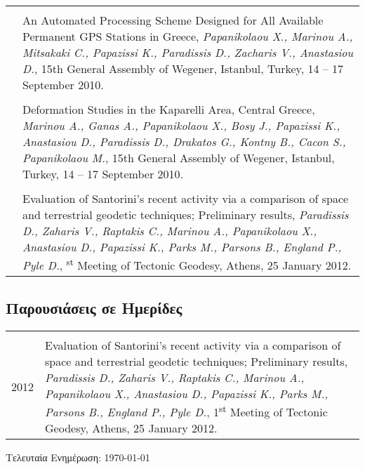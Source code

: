\documentclass[a4paper,10pt]{article} %
\begin{document}
\begin{longtable}{r|p{14cm}}
  &\\

  & An Automated Processing Scheme Designed for All Available Permanent GPS Stations in Greece,
  \emph{Papanikolaou X., Marinou A., Mitsakaki C., Papazissi K., Paradissis D., Zacharis V., Anastasiou D.},
  15th General Assembly of Wegener, Istanbul, Turkey, 14 – 17 September 2010.\\

  &\\

  & Deformation Studies in the Kaparelli Area, Central Greece,
  \emph{Marinou A., Ganas A., Papanikolaou X., Bosy J., Papazissi K., Anastasiou D., Paradissis D., Drakatos G., Kontny B., Cacon S., Papanikolaou M.},
  15th General Assembly of Wegener, Istanbul, Turkey, 14 – 17 September 2010.\\

  &\\

  & Evaluation of Santorini's recent activity via a comparison of space and terrestrial geodetic techniques; Preliminary results,
  \emph{Paradissis D., Zaharis V., Raptakis C., Marinou A., Papanikolaou X., Anastasiou D., Papazissi K., Parks M., Parsons B., England P., Pyle D.},
  \textsuperscript{st} Meeting of Tectonic Geodesy, Athens, 25 January 2012.\\
\end{longtable}

\subsection*{Παρουσιάσεις σε Ημερίδες}

\begin{longtable}{r|p{14cm}}
\multicolumn{2}{c}{} \\
  \textsc{2012}
  & Evaluation of Santorini's recent activity via a comparison of space and terrestrial geodetic techniques; Preliminary results,
  \emph{Paradissis D., Zaharis V., Raptakis C., Marinou A., Papanikolaou X., Anastasiou D., Papazissi K., Parks M., Parsons B., England P., Pyle D.},
  1\textsuperscript{st} Meeting of Tectonic Geodesy, Athens, 25 January 2012.\\
\end{longtable}
\medskip

\vfill
\begin{center}
  \begin{footnotesize}
    Τελευταία Ενημέρωση: \today
  \end{footnotesize}
\end{center}
\end{document}
